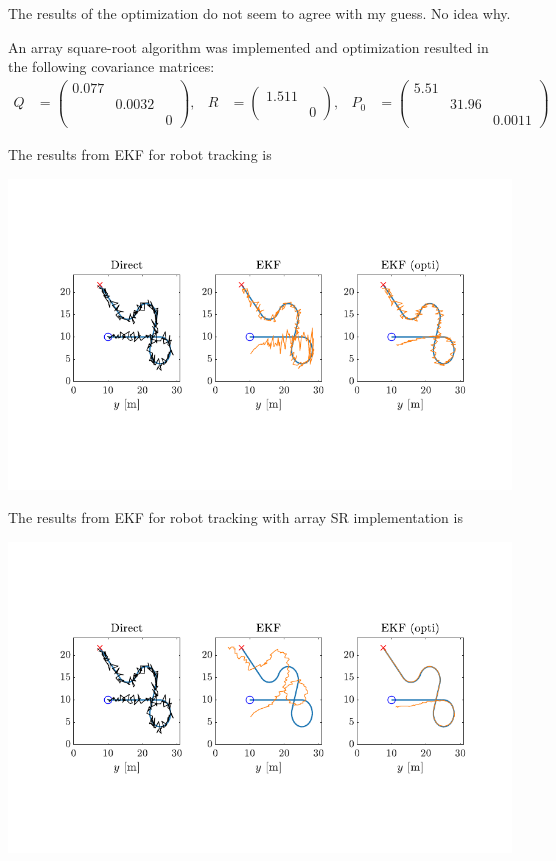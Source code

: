 The results of the optimization do not seem to agree with my guess. No idea why.

An array square-root algorithm was implemented and optimization resulted in the following covariance matrices:
\begin{align*}
    Q &= \begin{pmatrix}
        0.077 & & \\ & 0.0032 & \\ & & 0
    \end{pmatrix}, & 
    R &= \begin{pmatrix}
        1.511 & \\ & 0 
    \end{pmatrix}, & 
    P_0 &= \begin{pmatrix}
        5.51 & & \\ & 31.96 & \\ & & 0.0011
    \end{pmatrix}
\end{align*}

\clearpage 

The results from EKF for robot tracking is 

\includegraphics{figures/EKF_Le3.pdf}

The results from EKF for robot tracking with array SR implementation is 

\includegraphics{figures/EKF_Le3_SR.pdf}


